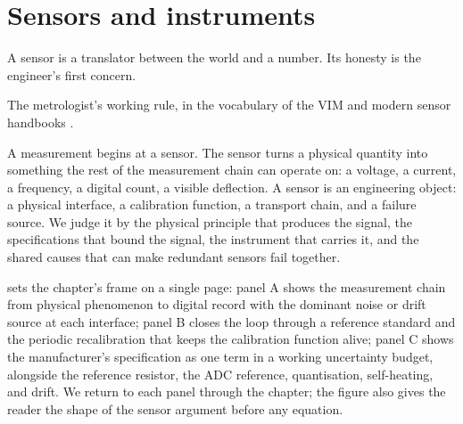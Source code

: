 \chapter{Sensors and instruments}
\label{vol01:ch05}

\epigraph{A sensor is a translator between the world and a number.
Its honesty is the engineer's first concern.}{The metrologist's
working rule, in the vocabulary of the VIM \cite{std:jcgm-vim} and
modern sensor handbooks \cite{text:fraden2016}.}


\noindent
A measurement begins at a sensor. The sensor turns a physical
quantity into something the rest of the measurement chain can
operate on: a voltage, a current, a frequency, a digital count, a
visible deflection. A sensor is an engineering object: a physical
interface, a calibration function, a transport chain, and a failure
source. We judge it by the physical principle that produces the
signal, the specifications that bound the signal, the instrument
that carries it, and the shared causes that can make redundant
sensors fail together.

 sets the chapter's frame on a
single page: panel A shows the measurement chain from physical
phenomenon to digital record with the dominant noise or drift source
at each interface; panel B closes the loop through a reference
standard and the periodic recalibration that keeps the calibration
function alive; panel C shows the manufacturer's specification as
one term in a working uncertainty budget, alongside the reference
resistor, the ADC reference, quantisation, self-heating, and drift.
We return to each panel through the chapter; the figure also gives
the reader the shape of the sensor argument before any equation.

